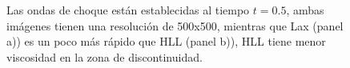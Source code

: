 \documentclass[12pt,a4paper]{book}
\begin{document}
\begin{figure}[H]
\centering
{}
\caption{\label{fig:Lax-hll-newtoniano1}Las ondas de choque están establecidas al tiempo $t = 0.5$, ambas imágenes tienen una resolución de 500x500, mientras que Lax (panel a)) es un poco más rápido que HLL (panel b)), HLL tiene menor viscosidad en la zona de discontinuidad.}  
\end{figure}
\end{document}
